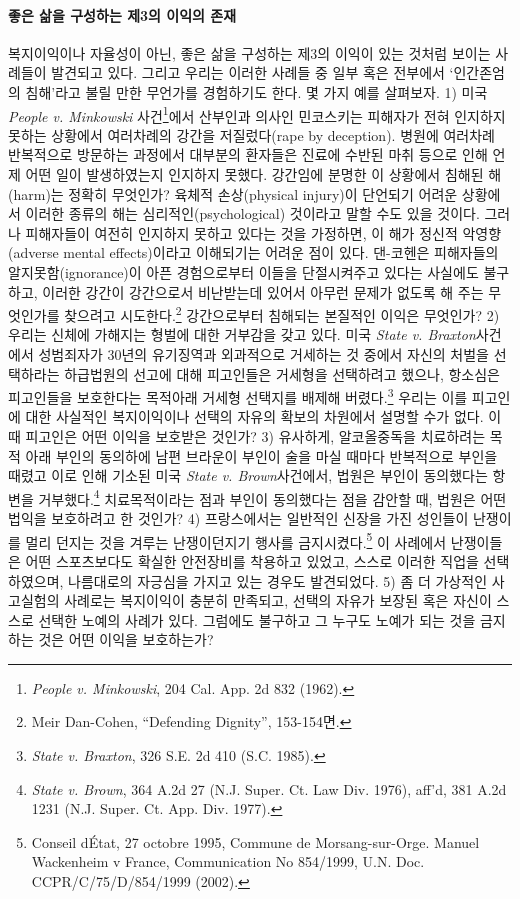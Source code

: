 \paragraph{좋은 삶을 구성하는 제3의 이익의 존재}

복지이익이나 자율성이 아닌, 좋은 삶을 구성하는 제3의 이익이 있는 것처럼 보이는 사례들이 발견되고 있다. 그리고 우리는 이러한 사례들 중 일부 혹은 전부에서 `인간존엄의 침해'라고 불릴 만한 무언가를 경험하기도 한다. 몇 가지 예를 살펴보자. 1) 미국 \emph{People v. Minkowski} 사건\footnote{\emph{People v. Minkowski}, 204 Cal. App. 2d 832 (1962).}에서 산부인과 의사인 민코스키는 피해자가 전혀 인지하지 못하는 상황에서 여러차례의 강간을 저질렀다(rape by deception). 병원에 여러차례 반복적으로 방문하는 과정에서 대부분의 환자들은 진료에 수반된 마취 등으로 인해 언제 어떤 일이 발생하였는지 인지하지 못했다. 강간임에 분명한 이 상황에서 침해된 해(harm)는 정확히 무엇인가? 육체적 손상(physical injury)이 단언되기 어려운 상황에서 이러한 종류의 해는 심리적인(psychological) 것이라고 말할 수도 있을 것이다. 그러나 피해자들이 여전히 인지하지 못하고 있다는 것을 가정하면, 이 해가 정신적 악영향(adverse mental effects)이라고 이해되기는 어려운 점이 있다. 댄-코헨은 피해자들의 알지못함(ignorance)이 아픈 경험으로부터 이들을 단절시켜주고 있다는 사실에도 불구하고, 이러한 강간이 강간으로서 비난받는데 있어서 아무런 문제가 없도록 해 주는 무엇인가를 찾으려고 시도한다.\footnote{Meir Dan-Cohen, ``Defending Dignity'', 153-154면.} 강간으로부터 침해되는 본질적인 이익은 무엇인가? 2) 우리는 신체에 가해지는 형벌에 대한 거부감을 갖고 있다. 미국 \emph{State v. Braxton}사건에서 성범죄자가 30년의 유기징역과 외과적으로 거세하는 것 중에서 자신의 처벌을 선택하라는 하급법원의 선고에 대해 피고인들은 거세형을 선택하려고 했으나, 항소심은 피고인들을 보호한다는 목적아래 거세형 선택지를 배제해 버렸다.\footnote{\emph{State v. Braxton}, 326 S.E. 2d 410 (S.C. 1985).} 우리는 이를 피고인에 대한 사실적인 복지이익이나 선택의 자유의 확보의 차원에서 설명할 수가 없다. 이때 피고인은 어떤 이익을 보호받은 것인가? 3) 유사하게, 알코올중독을 치료하려는 목적 아래 부인의 동의하에 남편 브라운이 부인이 술을 마실 때마다 반복적으로 부인을 때렸고 이로 인해 기소된 미국 \emph{State v. Brown}사건에서, 법원은 부인이 동의했다는 항변을 거부했다.\footnote{\emph{State v. Brown}, 364 A.2d 27 (N.J. Super. Ct. Law Div. 1976), aff'd, 381 A.2d 1231 (N.J. Super. Ct. App. Div. 1977).} 치료목적이라는 점과 부인이 동의했다는 점을 감안할 때, 법원은 어떤 법익을 보호하려고 한 것인가? 4) 프랑스에서는 일반적인 신장을 가진 성인들이 난쟁이를 멀리 던지는 것을 겨루는 난쟁이던지기 행사를 금지시켰다.\footnote{Conseil d\textquotesingle État, 27 octobre 1995, Commune de Morsang-sur-Orge. Manuel Wackenheim v France, Communication No 854/1999, U.N. Doc. CCPR/C/75/D/854/1999 (2002).} 이 사례에서 난쟁이들은 어떤 스포츠보다도 확실한 안전장비를 착용하고 있었고, 스스로 이러한 직업을 선택하였으며, 나름대로의 자긍심을 가지고 있는 경우도 발견되었다. 5) 좀 더 가상적인 사고실험의 사례로는 복지이익이 충분히 만족되고, 선택의 자유가 보장된 혹은 자신이 스스로 선택한 노예의 사례가 있다. 그럼에도 불구하고 그 누구도 노예가 되는 것을 금지하는 것은 어떤 이익을 보호하는가?

